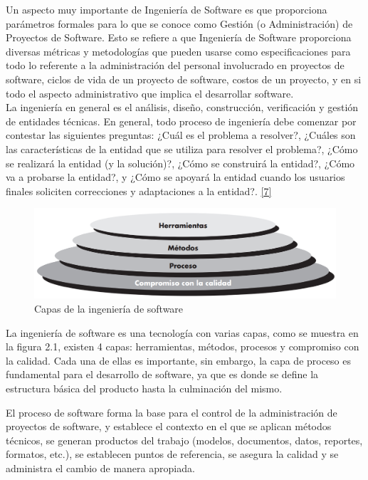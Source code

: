 Un aspecto muy importante de Ingeniería de Software es que proporciona parámetros formales para lo que se conoce como Gestión (o Administración) de Proyectos de Software. Esto se refiere a que Ingeniería de Software proporciona diversas métricas y metodologías que pueden usarse como especificaciones para todo lo referente a la administración del personal involucrado en proyectos de software, ciclos de vida de un proyecto de software, costos de un proyecto, y en si todo el aspecto administrativo que
implica el desarrollar software.\\

La ingeniería en general es el análisis, diseño, construcción, verificación y gestión de entidades técnicas. En general, todo proceso de ingeniería debe comenzar por contestar las siguientes preguntas: ¿Cuál es el problema a
resolver?, ¿Cuáles son las características de la entidad que se utiliza para resolver el problema?, ¿Cómo se realizará la entidad (y la solución)?, ¿Cómo se construirá la entidad?, ¿Cómo va a probarse la entidad?, y ¿Cómo se apoyará la entidad cuando los
usuarios finales soliciten correcciones y adaptaciones a la entidad?.  \hyperlink{b07}{[7]}  \\

\begin{figure}[H]
	\begin{center}
		\includegraphics[width=.95\textwidth]{images/CapasIS}
		\caption{Capas de la ingeniería de software}
		\label{fig:capas_is}
	\end{center}
\end{figure}

La ingeniería de software es una tecnología con varias capas, como se muestra en la figura 2.1, existen 4 capas: herramientas, métodos, procesos y compromiso con la calidad. Cada una de ellas es importante, sin embargo, la capa de proceso es fundamental para el desarrollo de software, ya que es donde se define la estructura básica del producto hasta la culminación del mismo.

El proceso de software forma la base para el control de la administración de proyectos de software, y establece el contexto en el que se aplican métodos técnicos, se generan productos del trabajo (modelos, documentos, datos, reportes, formatos, etc.), se establecen puntos de referencia, se asegura la calidad y se administra el cambio de manera apropiada.

